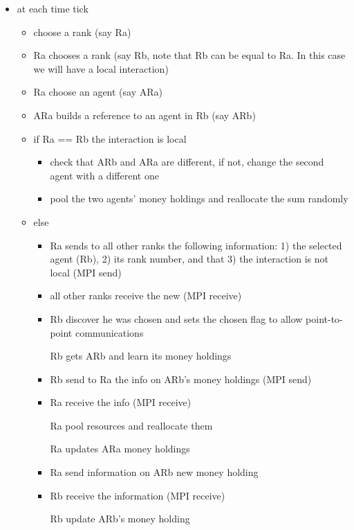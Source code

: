 \documentclass{article}
\providecommand{\tightlist}{%
  \setlength{\itemsep}{0pt}\setlength{\parskip}{0pt}}
\begin{document}
\begin{itemize}
\tightlist
\item
  at each time tick

  \begin{itemize}
  \tightlist
  \item
    choose a rank (say Ra)
  \item
	  Ra chooses a rank (say Rb, note that Rb can be equal to Ra. In this case we will have a local interaction)
  \item
    Ra choose an agent (say ARa)
   \item
	   ARa builds a reference to an agent in Rb (say ARb)
  \item
    if Ra == Rb the interaction is local
    \begin{itemize}
		    \tightlist
    \item
	    check that ARb and ARa are different, if not, change the second agent with a different one
    \item
      pool the two agents' money holdings and reallocate the sum randomly
    \end{itemize}
  \item
    else

    \begin{itemize}
    \tightlist
    \item
    Ra sends to all other ranks the following information: 1) the selected agent (Rb), 2) its rank number, and that 3) the interaction is not local (MPI send)
    \item
	    all other ranks receive the new (MPI receive)
    \item
	    Rb discover he was chosen and sets the chosen flag to allow point-to-point communications
	    
	    Rb gets ARb and learn its money holdings
    \item
	    Rb send to Ra the info on ARb's money holdings (MPI send)
    \item
	    Ra receive the info (MPI receive)

	    Ra pool resources and reallocate them

	    Ra updates ARa money holdings
    \item
	    Ra send information on ARb new money holding
    \item
	    Rb receive the information (MPI receive)

	    Rb update ARb's money holding
    \end{itemize}
  \end{itemize}
\end{itemize}
\end{document}
